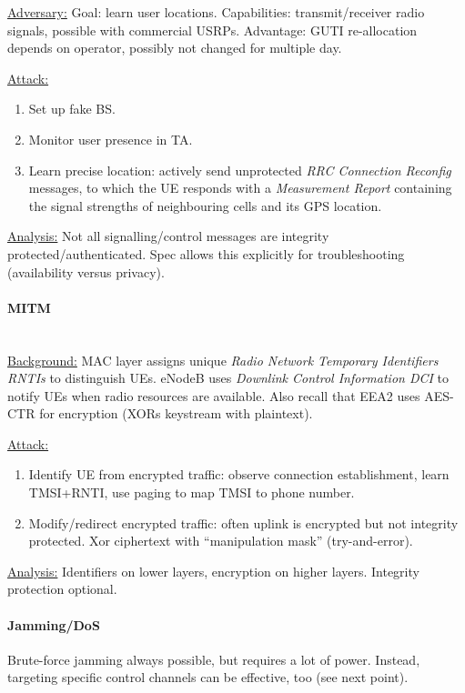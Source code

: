 \underline{Adversary:}
Goal: learn user locations.
Capabilities: transmit/receiver radio signals, possible with commercial USRPs.
Advantage: GUTI re-allocation depends on operator, possibly not changed for multiple day.

\underline{Attack:}
\begin{enumerate}
	\item Set up fake BS.
	\item Monitor user presence in TA.
	\item Learn precise location: actively send unprotected \textit{RRC Connection
		      Reconfig} messages, to which the UE responds with a \textit{Measurement Report}
	      containing the signal strengths of neighbouring cells and its GPS location.
\end{enumerate}

\underline{Analysis:}
Not all signalling/control messages are integrity protected/authenticated.
Spec allows this explicitly for troubleshooting (availability versus privacy).

\paragraph{MITM} \mbox{} \\
\underline{Background:}
MAC layer assigns unique \textit{Radio Network Temporary Identifiers RNTIs} to distinguish UEs.
eNodeB uses \textit{Downlink Control Information DCI} to notify UEs when radio resources are available.
Also recall that EEA2 uses AES-CTR for encryption (XORs keystream with plaintext).

\underline{Attack:}
\begin{enumerate}
	\item Identify UE from encrypted traffic: observe connection establishment, learn
	      TMSI+RNTI, use paging to map TMSI to phone number.
	\item Modify/redirect encrypted traffic: often uplink is encrypted but not integrity
	      protected. Xor ciphertext with ``manipulation mask'' (try-and-error).
\end{enumerate}

\underline{Analysis:}
Identifiers on lower layers, encryption on higher layers.
Integrity protection optional.

\paragraph{Jamming/DoS}
Brute-force jamming always possible, but requires a lot of power. Instead,
targeting specific control channels can be effective, too (see next point).

